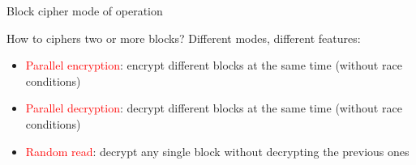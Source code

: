 \begin{frame}{Block cipher mode of operation}

  How to ciphers two or more blocks? Different modes, different features:
  
  \begin{itemize}
    \item \textcolor{red}{Parallel encryption}: encrypt different blocks at the same time (without race conditions)
    \item \textcolor{red}{Parallel decryption}: decrypt different blocks at the same time (without race conditions)
    \item \textcolor{red}{Random read}: decrypt any single block without decrypting the previous ones
  \end{itemize}


\end{frame}

